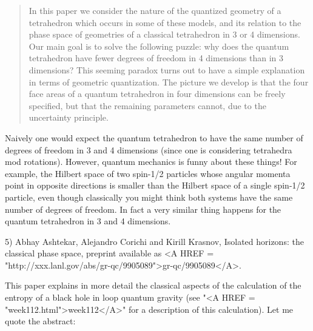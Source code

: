 \begin{quote}
In this paper we consider the nature of the quantized geometry of a
tetrahedron which occurs in some of these models, and its relation to
the phase space of geometries of a classical tetrahedron in 3 or 4
dimensions.  Our main goal is to solve the following puzzle: why does
the quantum tetrahedron have fewer degrees of freedom in 4 dimensions
than in 3 dimensions?  This seeming paradox turns out to have a simple
explanation in terms of geometric quantization. The picture we develop 
is that the four face areas of a quantum tetrahedron in four dimensions 
can be freely specified, but that the remaining parameters cannot, due
to the uncertainty principle.
\end{quote}

Naively one would expect the quantum tetrahedron to have the same number
of degrees of freedom in 3 and 4 dimensions (since one is considering
tetrahedra mod rotations).  However, quantum mechanics is funny about
these things!  For example, the Hilbert space of two spin-1/2 particles
whose angular momenta point in opposite directions is smaller than the
Hilbert space of a single spin-1/2 particle, even though classically you
might think both systems have the same number of degrees of freedom.  
In fact a very similar thing happens for the quantum tetrahedron in 3
and 4 dimensions.

5) Abhay Ashtekar, Alejandro Corichi and Kirill Krasnov, Isolated horizons:
the classical phase space, preprint available as <A HREF =
"http://xxx.lanl.gov/abs/gr-qc/9905089">gr-qc/9905089</A>.


 This paper explains in more detail the classical aspects of the
calculation of the entropy of a black hole in loop quantum gravity (see
"<A HREF = "week112.html">week112</A>" for a description of
this calculation).  Let me quote the abstract:

